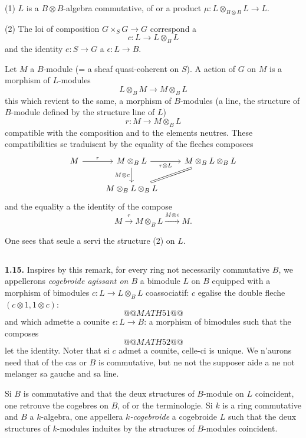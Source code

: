 \documentclass[12pt,a4paper]{article}
\theoremstyle{plain}
\theoremstyle{definition}
\theoremstyle{remark}
\begin{document}
(1) $L$ is a $B \otimes B$-algebra commutative, of or a product $\mu : L \otimes_{B \otimes B} L \to L$.

(2) The loi of composition $G \times_S G \to G$ correspond a
\[
c : L \to L \otimes_B L
\]
and the identity $e : S \to G$ a $\epsilon : L \to B$.

Let $M$ a $B$-module (= a sheaf quasi-coherent on $S$). A action of $G$ on $M$ is a morphism of $L$-modules
\[
L \otimes_B M \to M \otimes_B L
\]
this which revient to the same, a morphism of $B$-modules (a line, the structure of $B$-module defined by the structure line of $L$)
\[
r : M \to M \otimes_B L
\]
compatible with the composition and to the elements neutres. These compatibilities se traduisent by the equality of the fleches composees
\begin{equation}\label{eq:1.14.1}
\begin{tikzcd}
M \arrow[r, "r"] & M \otimes_B L \arrow[r, "r \otimes L"'] \arrow[d, "M \otimes c"'] & M \otimes_B L \otimes_B L \\
& M \otimes_B L \otimes_B L \arrow[ru, equal]
\end{tikzcd}
\end{equation}
and the equality a the identity of the compose
\begin{equation}\label{eq:1.14.2}
M \xrightarrow{r} M \otimes_B L \xrightarrow{M \otimes \epsilon} M.
\end{equation}

One sees that seule a servi the structure (2) on $L$.

\subsection{}

\textbf{1.15.} Inspires by this remark, for every ring not necessarily commutative $B$, we appellerons \emph{cogebroide agissant on $B$} a bimodule $L$ on $B$ equipped with a morphism of bimodules $c : L \to L \otimes_B L$ coassociatif: $c$ egalise the double fleche $(c \otimes 1, 1 \otimes c)$:
\[
@@MATH51@@
\]
and which admette a counite $\epsilon : L \to B$: a morphism of bimodules such that the composes
\[
@@MATH52@@
\]
let the identity. Noter that si $c$ admet a counite, celle-ci is unique. We n'aurons need that of the cas or $B$ is commutative, but ne not the supposer aide a ne not melanger sa gauche and sa line.

Si $B$ is commutative and that the deux structures of $B$-module on $L$ coincident, one retrouve the cogebres on $B$, of or the terminologie. Si $k$ is a ring commutative and $B$ a $k$-algebra, one appellera \emph{$k$-cogebroide} a cogebroide $L$ such that the deux structures of $k$-modules induites by the structures of $B$-modules coincident.
\end{document}
